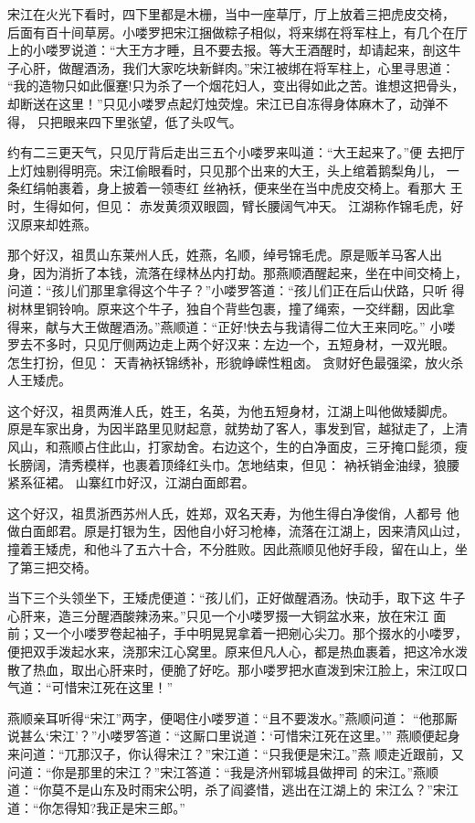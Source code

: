 宋江在火光下看时，四下里都是木栅，当中一座草厅，厅上放着三把虎皮交椅，
后面有百十间草房。小喽罗把宋江捆做粽子相似，将来绑在将军柱上，有几个在厅
上的小喽罗说道：“大王方才睡，且不要去报。等大王酒醒时，却请起来，剖这牛
子心肝，做醒酒汤，我们大家吃块新鲜肉。”宋江被绑在将军柱上，心里寻思道：
“我的造物只如此偃蹇!只为杀了一个烟花妇人，变出得如此之苦。谁想这把骨头，
却断送在这里！”只见小喽罗点起灯烛荧煌。宋江已自冻得身体麻木了，动弹不得，
只把眼来四下里张望，低了头叹气。

约有二三更天气，只见厅背后走出三五个小喽罗来叫道：“大王起来了。”便
去把厅上灯烛剔得明亮。宋江偷眼看时，只见那个出来的大王，头上绾着鹅梨角儿，
一条红绢帕裹着，身上披着一领枣红丝衲袄，便来坐在当中虎皮交椅上。看那大
王时，生得如何，但见：
赤发黄须双眼圆，臂长腰阔气冲天。
江湖称作锦毛虎，好汉原来却姓燕。

那个好汉，祖贯山东莱州人氏，姓燕，名顺，绰号锦毛虎。原是贩羊马客人出
身，因为消折了本钱，流落在绿林丛内打劫。那燕顺酒醒起来，坐在中间交椅上，
问道：“孩儿们那里拿得这个牛子？”小喽罗答道：“孩儿们正在后山伏路，只听
得树林里铜铃响。原来这个牛子，独自个背些包裹，撞了绳索，一交绊翻，因此拿
得来，献与大王做醒酒汤。”燕顺道：“正好!快去与我请得二位大王来同吃。”
小喽罗去不多时，只见厅侧两边走上两个好汉来：左边一个，五短身材，一双光眼。
怎生打扮，但见：
天青衲袄锦绣补，形貌峥嵘性粗卤。
贪财好色最强梁，放火杀人王矮虎。

这个好汉，祖贯两淮人氏，姓王，名英，为他五短身材，江湖上叫他做矮脚虎。
原是车家出身，为因半路里见财起意，就势劫了客人，事发到官，越狱走了，上清
风山，和燕顺占住此山，打家劫舍。右边这个，生的白净面皮，三牙掩口髭须，瘦
长膀阔，清秀模样，也裹着顶绛红头巾。怎地结束，但见：
衲袄销金油绿，狼腰紧系征裙。
山寨红巾好汉，江湖白面郎君。

这个好汉，祖贯浙西苏州人氏，姓郑，双名天寿，为他生得白净俊俏，人都号
他做白面郎君。原是打银为生，因他自小好习枪棒，流落在江湖上，因来清风山过，
撞着王矮虎，和他斗了五六十合，不分胜败。因此燕顺见他好手段，留在山上，坐
了第三把交椅。

当下三个头领坐下，王矮虎便道：“孩儿们，正好做醒酒汤。快动手，取下这
牛子心肝来，造三分醒酒酸辣汤来。”只见一个小喽罗掇一大铜盆水来，放在宋江
面前；又一个小喽罗卷起袖子，手中明晃晃拿着一把剜心尖刀。那个掇水的小喽罗，
便把双手泼起水来，浇那宋江心窝里。原来但凡人心，都是热血裹着，把这冷水泼
散了热血，取出心肝来时，便脆了好吃。那小喽罗把水直泼到宋江脸上，宋江叹口
气道：“可惜宋江死在这里！”

燕顺亲耳听得“宋江”两字，便喝住小喽罗道：“且不要泼水。”燕顺问道：
“他那厮说甚么‘宋江’？”小喽罗答道：“这厮口里说道：‘可惜宋江死在这里。’”
燕顺便起身来问道：“兀那汉子，你认得宋江？”宋江道：“只我便是宋江。”燕
顺走近跟前，又问道：“你是那里的宋江？”宋江答道：“我是济州郓城县做押司
的宋江。”燕顺道：“你莫不是山东及时雨宋公明，杀了阎婆惜，逃出在江湖上的
宋江么？”宋江道：“你怎得知?我正是宋三郎。”

